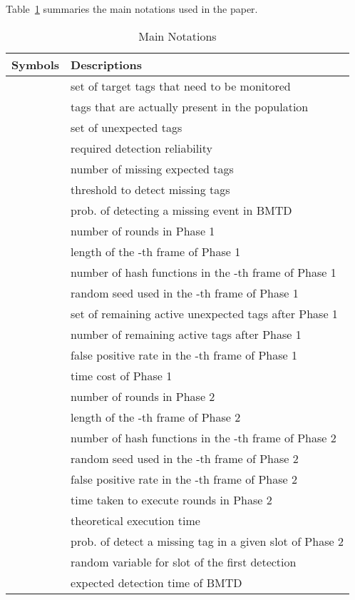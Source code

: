 \documentclass[10pt, twocolumn]{IEEEtran}
\begin{document}
Table~\ref{Tab:notation} summaries the main notations used in the paper.
\begin{table}[!htbp]
\centering
\caption{Main Notations}
\label{Tab:notation}
\begin{tabular}{|l|l|}
\hline
\textbf{Symbols} & \textbf{Descriptions}\\
\hline
& set of target tags that need to be monitored \\
\hline
& tags that are actually present in the population\\
\hline
& set of unexpected tags\\
\hline
& required detection reliability\\
\hline
& number of missing expected tags\\
\hline
& threshold to detect missing tags\\
\hline
& prob. of detecting a missing event in BMTD\\
\hline
& number of rounds in Phase 1\\
\hline
& length of the -th frame of Phase 1 \\
\hline
& number of hash functions in the -th frame of Phase 1\\
\hline
& random seed used in the -th frame of Phase 1\\
\hline
 & set of remaining active unexpected tags after Phase 1\\
\hline
 & number of remaining active tags after Phase 1\\
\hline
& false positive rate in the -th frame of Phase 1\\
\hline
& time cost of Phase 1\\
\hline
&number of rounds in Phase 2\\
\hline
& length of the -th frame of Phase 2 \\
\hline
& number of hash functions in the -th frame of Phase 2\\
\hline
& random seed used in the -th frame of Phase 2\\
\hline
& false positive rate in the -th frame of Phase 2\\
\hline
& time taken to execute  rounds in Phase 2\\
\hline
& theoretical execution time\\
\hline
& prob. of detect a missing tag in a given slot of Phase 2\\
\hline
& random variable for slot of the first detection\\
\hline
& expected detection time of BMTD\\
\hline
\end{tabular}
\end{table}
\end{document}
